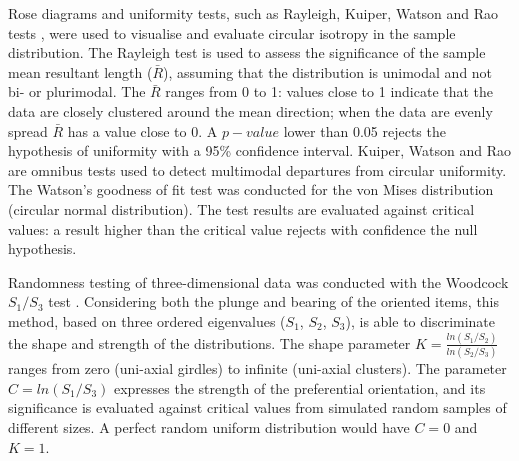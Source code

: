 \documentclass[preprint,authoryear,times]{elsarticle} %
\begin{document}
\begin{table}[]
  \caption{List of sampled observations for the fabric analysis.}
  \label{tab:1}
  \vspace{0.1in}
\end{table}

Rose diagrams and uniformity tests, such as Rayleigh, Kuiper, Watson and Rao tests \citep{Jammalamadaka2001}, were used to visualise and evaluate circular isotropy in the sample distribution. The Rayleigh test is used to assess the significance of the sample mean resultant length ($\bar{R}$), assuming that the distribution is unimodal and not bi- or plurimodal. The $\bar{R}$ ranges from 0 to 1: values close to 1 indicate that the data are closely clustered around the mean direction; when the data are evenly spread $\bar{R}$ has a value close to 0. A $p-value$ lower than 0.05 rejects the hypothesis of uniformity with a 95\% confidence interval. Kuiper, Watson and Rao are omnibus tests used to detect multimodal departures from circular uniformity. The Watson's goodness of fit test was conducted for the von Mises distribution (circular normal distribution). The test results are evaluated against critical values: a result higher than the critical value rejects with confidence the null hypothesis.

Randomness testing of three-dimensional data was conducted with the Woodcock $S_1/S_3$ test \citep{Woodcock1983}. Considering both the plunge and bearing of the oriented items, this method, based on three ordered eigenvalues ($S_1$, $S_2$, $S_3$), is able to discriminate the shape and strength of the distributions. The shape parameter $K=\frac{ln(S_1/S_2)}{ln(S_2/S_3)}$ ranges from zero (uni-axial girdles) to infinite (uni-axial clusters). The parameter $C=ln(S_1/S_3)$ expresses the strength of the preferential orientation, and its significance is evaluated against critical values from simulated random samples of different sizes. A perfect random uniform distribution would have $C=0$ and $K=1$.
\end{document}
